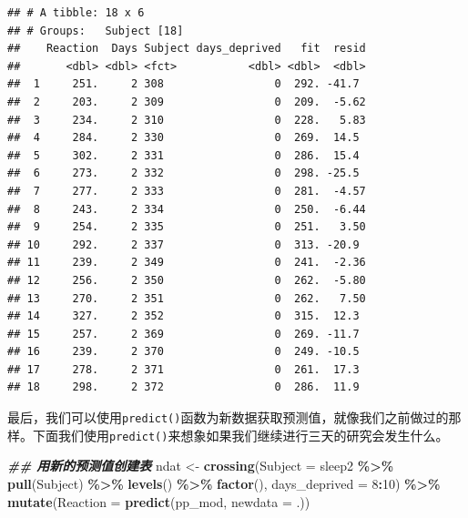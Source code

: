 \documentclass[
]{book}
\newenvironment{Shaded}{\begin{snugshade}}{\end{snugshade}}
\newcommand{\AttributeTok}[1]{\textcolor[rgb]{0.13,0.29,0.53}{#1}}
\newcommand{\DecValTok}[1]{\textcolor[rgb]{0.00,0.00,0.81}{#1}}
\newcommand{\DocumentationTok}[1]{\textcolor[rgb]{0.56,0.35,0.01}{\textbf{\textit{#1}}}}
\newcommand{\FunctionTok}[1]{\textcolor[rgb]{0.13,0.29,0.53}{\textbf{#1}}}
\newcommand{\NormalTok}[1]{#1}
\newcommand{\OtherTok}[1]{\textcolor[rgb]{0.56,0.35,0.01}{#1}}
\newcommand{\SpecialCharTok}[1]{\textcolor[rgb]{0.81,0.36,0.00}{\textbf{#1}}}
\begin{document}
\begin{verbatim}
## # A tibble: 18 x 6
## # Groups:   Subject [18]
##    Reaction  Days Subject days_deprived   fit  resid
##       <dbl> <dbl> <fct>           <dbl> <dbl>  <dbl>
##  1     251.     2 308                 0  292. -41.7 
##  2     203.     2 309                 0  209.  -5.62
##  3     234.     2 310                 0  228.   5.83
##  4     284.     2 330                 0  269.  14.5 
##  5     302.     2 331                 0  286.  15.4 
##  6     273.     2 332                 0  298. -25.5 
##  7     277.     2 333                 0  281.  -4.57
##  8     243.     2 334                 0  250.  -6.44
##  9     254.     2 335                 0  251.   3.50
## 10     292.     2 337                 0  313. -20.9 
## 11     239.     2 349                 0  241.  -2.36
## 12     256.     2 350                 0  262.  -5.80
## 13     270.     2 351                 0  262.   7.50
## 14     327.     2 352                 0  315.  12.3 
## 15     257.     2 369                 0  269. -11.7 
## 16     239.     2 370                 0  249. -10.5 
## 17     278.     2 371                 0  261.  17.3 
## 18     298.     2 372                 0  286.  11.9
\end{verbatim}

最后，我们可以使用\texttt{predict()}函数为新数据获取预测值，就像我们之前做过的那样。下面我们使用\texttt{predict()}来想象如果我们继续进行三天的研究会发生什么。

\begin{Shaded}
\begin{Highlighting}[]
\DocumentationTok{\#\# 用新的预测值创建表}
\NormalTok{ndat }\OtherTok{\textless{}{-}} \FunctionTok{crossing}\NormalTok{(}\AttributeTok{Subject =}\NormalTok{ sleep2 }\SpecialCharTok{\%\textgreater{}\%} \FunctionTok{pull}\NormalTok{(Subject) }\SpecialCharTok{\%\textgreater{}\%} \FunctionTok{levels}\NormalTok{() }\SpecialCharTok{\%\textgreater{}\%} \FunctionTok{factor}\NormalTok{(),}
                 \AttributeTok{days\_deprived =} \DecValTok{8}\SpecialCharTok{:}\DecValTok{10}\NormalTok{) }\SpecialCharTok{\%\textgreater{}\%}
  \FunctionTok{mutate}\NormalTok{(}\AttributeTok{Reaction =} \FunctionTok{predict}\NormalTok{(pp\_mod, }\AttributeTok{newdata =}\NormalTok{ .))}
\end{Highlighting}
\end{Shaded}
\end{document}
